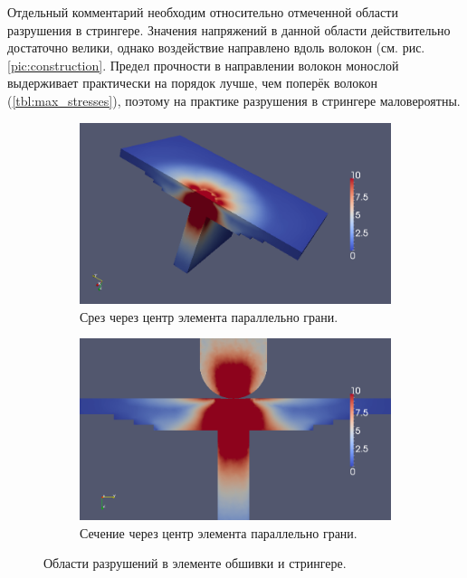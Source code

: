 Отдельный комментарий необходим относительно отмеченной области разрушения в стрингере. Значения напряжений в данной области действительно достаточно велики, однако воздействие направлено вдоль волокон (см. рис. \ref{pic:construction}. Предел прочности в направлении волокон монослой выдерживает практически на порядок лучше, чем поперёк волокон (\ref{tbl:max_stresses}), поэтому на практике разрушения в стрингере маловероятны.

\begin{figure}[htp]
\begin{subfigure}[b]{\textwidth}
\center
\includegraphics[width=\textwidth]{png/pkm-experiment/wing-stringer/sum-3d.png}
\caption{Срез через центр элемента параллельно грани.}
\end{subfigure}
\begin{subfigure}[b]{\textwidth}
\center
\includegraphics[width=\textwidth]{png/pkm-experiment/wing-stringer/sum.png}
\caption{Сечение через центр элемента параллельно грани.}
\end{subfigure}
\caption{Области разрушений в элементе обшивки и стрингере.}
\label{pic:pkm_experiment_wing_stringer_result}
\end{figure}

